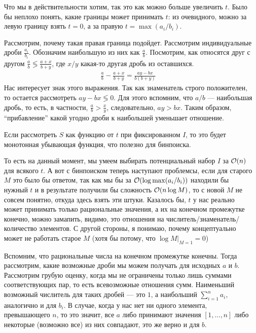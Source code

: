 \begin{solution}
    Что мы в действительности хотим, так это как можно больше увеличить $t$. Было бы неплохо понять, какие границы может принимать $t$: из очевидного, можно за левую границу взять $t=0$, а за правую $t=\max(a_i/b_i)$.
    \begin{remark}
        Рассмотрим, почему такая правая граница подойдет. Рассмотрим индивидуальные дроби $\frac{a_i}{b_i}$. Обозначим наибольшую из них как $\frac{a}{b}$. Посмотрим, как относятся друг с другом $\frac{a}{b}\lessgtr\frac{a+x}{b+y}$, где $x/y$ какая-то другая дробь из оставшихся.
        \begin{gather}
            \frac{a}{b} - \frac{a+x}{b+y} = \frac{ay-bx}{b(b+y)}
        \end{gather}
        Нас интересует знак этого выражения. Так как знаменатель строго положителен, то остается рассмотреть $ay-bx \lessgtr 0$.
        Для этого вспомним, что $a/b$ --- наибольшая дробь, то есть, в частности, $\frac{a}{b} > \frac{x}{y}$, следовательно, $ay > bx$. Таким образом, ``прибавление'' какой угодно дроби к наибольшей уменьшает отношение.
    \end{remark}
    \begin{remark}
        Если рассмотреть $S$ как функцию от $t$ при фиксированном $I$, то это будет монотонная убывающая функция, что полезно для бинпоиска.
    \end{remark}
    То есть на данный момент, мы умеем выбирать потенциальный набор $I$ за $\mathcal{O}(n)$ для всякого $t$. А вот с бинпоиском теперь наступают проблемсы, если для старого $M$ это было бы ответом, так как мы бы за $\mathcal{O}(\log \max(a_i/b_i))$ находили бы нужный $t$ и в результате получили бы сложность $\mathcal{O}(n\log M)$, то с новой $M$ не совсем понятно, откуда здесь взять эти штуки. Казалось бы, $t$ у нас реально может принимать только рациональные значения, а их на конечном промежутке конечно, можно замапить, видимо, это отношения на числитель/знаменатель/количество элементов. С другой стороны, я понимаю, почему концептуально может не работать старое $M$ (хотя бы потому, что $\log M\Big|_{M=1} =0 $)
    \begin{upd}
        Вспомним, что рациональные числа на конечном промежутке конечны. Тогда рассмотрим, какие возможные дроби мы можем получать для исходных $a$ и $b$. Рассмотрим грубую оценку, когда мы не ограничены только лишь суммами соответствующих пар, то есть всевозможные отношения сумм. Наименьший возможный числитель для таких дробей --- это $1$, а наибольший $\sum\limits_{i=1}^na_i$, аналогично и для $b_i$. В случае, когда у нас нет ни одного элемента, превышающего $n$, то это значит, все $a$ либо принимают значения $[1,\ldots,n]$ либо некоторые (возможно все) из них совпадают, это же верно и для $b$.


\end{upd}
\end{solution}
